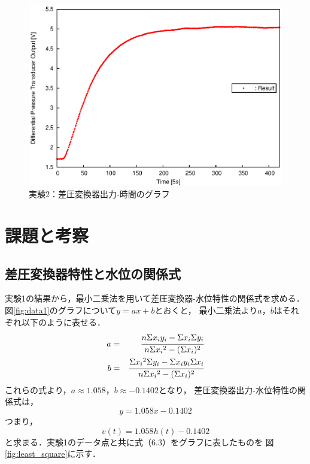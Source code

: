 \documentclass[11pt,a4paper]{jsarticle}
\begin{document}
    \begin{figure}[b]
      \begin{center}
        \includegraphics[width=0.9\hsize]{./fig/data2dpt.eps}
      \end{center}
      \caption{実験2：差圧変換器出力-時間のグラフ}
      \label{fig:data2dpt}
    \end{figure}

\section{課題と考察}
  \setcounter{equation}{0}
  \setcounter{figure}{0}
  \setcounter{table}{0}

  \subsection{差圧変換器特性と水位の関係式}
    実験1の結果から，最小二乗法を用いて差圧変換器-水位特性の関係式を求める．
    図\ref{fig:data1}のグラフについて$y = a x + b$とおくと，
    最小二乗法より$a$，$b$はそれぞれ以下のように表せる．
    \begin{eqnarray}
      a &=& \cfrac{n \Sigma x_i y_i - \Sigma x_i \Sigma y_i}
                  {n \Sigma {x_i}^2 - ( \Sigma x_i )^2} \\
      \vspace{5mm}
      b &=& \cfrac{\Sigma {x_i}^2 \Sigma y_i - \Sigma x_i y_i \Sigma x_i}
                  {n \Sigma {x_i}^2 - ( \Sigma x_i )^2}
    \end{eqnarray}
    これらの式より，$a \approx 1.058 $，$b \approx -0.1402$となり，
    差圧変換器出力-水位特性の関係式は，
    \begin{equation}
      y = 1.058 x - 0.1402
    \end{equation}
    つまり，
    \begin{equation}
      v(t) = 1.058 h(t) - 0.1402
    \end{equation}
    と求まる．実験1のデータ点と共に式（6.3）をグラフに表したものを
    図\ref{fig:least_square}に示す．
    
\end{document}
